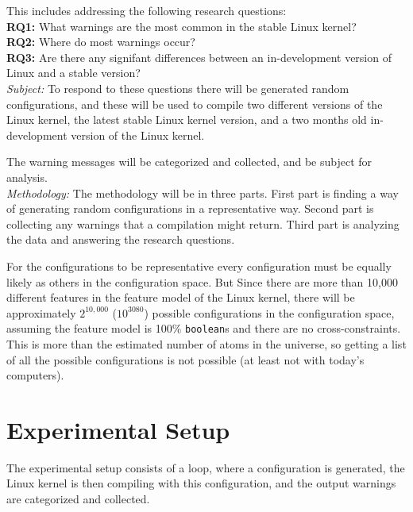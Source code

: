 \documentclass[a4paper,11pt]{report}
\begin{document}
This includes addressing the following research questions:
\\

\textbf{RQ1:} What warnings are the most common in the stable Linux kernel?
\\

\textbf{RQ2:} Where do most warnings occur?
\\

\textbf{RQ3:} Are there any signifant differences between an in-development 
version of Linux and a stable version?
\\

\emph{Subject:}
To respond to these questions there will be generated random configurations, 
and these will be used to compile two different versions of the Linux kernel, 
the latest stable Linux kernel version, and a two months old in-development 
version of the Linux kernel.

The warning messages will be categorized and collected, and be subject for 
analysis.
\\

\emph{Methodology:}
The methodology will be in three parts. First part is finding a way of
generating random configurations in a representative way. Second part is 
collecting any warnings that a compilation might return. Third part is 
analyzing the data and answering the research questions.
\\

        \def \fn{Not counting cross-tree contraints, but also saying 
        everything is a \texttt{boolean} and not \texttt{tristate}, or 
        \texttt{string}.}

For the configurations to be representative every configuration must be equally 
likely as others in the configuration space. But Since there are more than 
10,000 different features in the feature model of the Linux kernel, there will 
be approximately $2^{10,000}$ ($10^{3080}$) possible configurations in the 
configuration space, assuming the feature model is 100\% \texttt{boolean}s and 
there are no cross-constraints.  This is more than the estimated number of 
atoms in the universe, so getting a list of all the possible configurations is 
not possible (at least not with today's computers).


            \section{Experimental Setup}
The experimental setup consists of a loop, where a configuration is generated,
the Linux kernel is then compiling with this configuration, and the output 
warnings are categorized and collected.
\\
\end{document}
